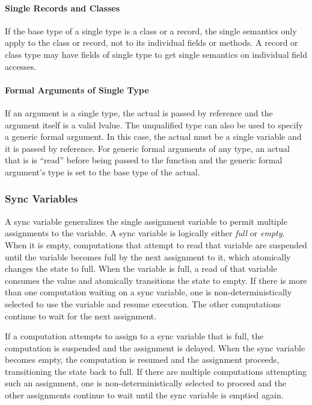 \paragraph{Single Records and Classes}
If the base type of a single type is a class or a record, the single
semantics only apply to the class or record, not to its individual
fields or methods.  A record or class type may have fields of single
type to get single semantics on individual field accesses.

\paragraph{Formal Arguments of Single Type}
If an argument is a single type, the actual is passed by reference and
the argument itself is a valid lvalue.  The unqualified
type  can also be used to specify a generic formal
argument.  In this case, the actual must be a single variable and it
is passed by reference.  For generic formal arguments of any type, an
actual that is  is ``read'' before being passed to the
function and the generic formal argument's type is set to the base
type of the actual.

\subsubsection{Sync Variables}
\label{Sync_Variables}

A sync variable generalizes the single assignment variable to permit
multiple assignments to the variable.  A sync variable is logically
either {\em full} or {\em empty}.  When it is empty, computations that
attempt to read that variable are suspended until the variable becomes
full by the next assignment to it, which atomically changes the state
to full.  When the variable is full, a read of that variable consumes
the value and atomically transitions the state to empty.  If there is
more than one computation waiting on a sync variable, one is
non-deterministically selected to use the variable and resume
execution.  The other computations continue to wait for the next
assignment.

If a computation attempts to assign to a sync variable that is full,
the computation is suspended and the assignment is delayed.  When the
sync variable becomes empty, the computation is resumed and the
assignment proceeds, transitioning the state back to full.  If there
are multiple computations attempting such an assignment, one is
non-deterministically selected to proceed and the other assignments
continue to wait until the sync variable is emptied again.

